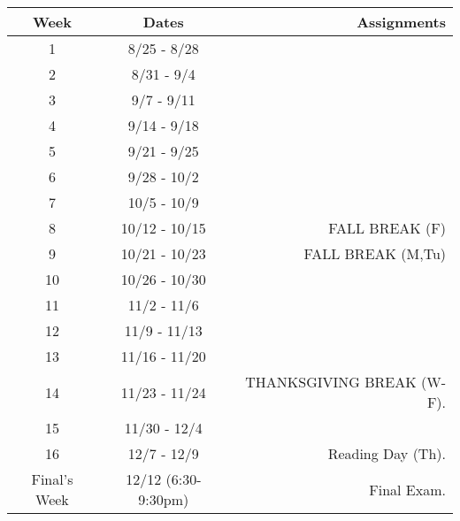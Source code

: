 \documentclass[10pt]{article}
\begin{document}
\begin{center}
\begin{tabular}{|c|c|r|}
\hline 
Week & Dates & Assignments \\
\hline
1 & 8/25 - 8/28 &  \\
\hline 
2 & 8/31 - 9/4 &   \\
\hline
3 & 9/7 - 9/11 &   \\
\hline
4 & 9/14 - 9/18 &   \\
\hline
5 & 9/21 - 9/25 &  \\
\hline
6 & 9/28 - 10/2 & \\
\hline
7 & 10/5 - 10/9  &  \\
\hline 
8 & 10/12 - 10/15 &  FALL BREAK (F) \\
\hline
9 & 10/21 - 10/23 & FALL BREAK (M,Tu) \\
\hline
10 & 10/26 - 10/30 &  \\
\hline
11 & 11/2 - 11/6 & \\
\hline
12 & 11/9 - 11/13 &  \\
\hline
13 & 11/16 - 11/20 & \\
\hline
14 & 11/23 - 11/24 &  THANKSGIVING BREAK (W-F).   \\
\hline
15 & 11/30 - 12/4 & \\ 
\hline
16 & 12/7 - 12/9 &   Reading Day (Th). \\
\hline
Final's Week & 12/12 (6:30-9:30pm) & Final Exam. \\ 
\hline
\end{tabular}
\end{center}
\end{document}
